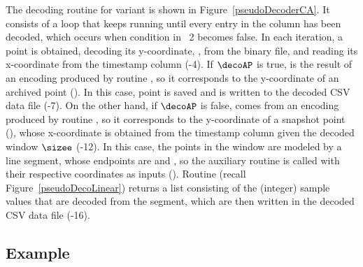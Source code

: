 \clearpage




\vspace{-9pt}



\vspace{-7pt}
The decoding routine for variant \maskalgo is shown in Figure~\ref{pseudoDecoderCA}. It consists of a loop that keeps running until every entry in the column has been decoded, which occurs when condition in \Line~2 becomes false. In each iteration, a point is obtained, decoding its y-coordinate, , from the binary file, and reading its x-coordinate from the timestamp column (-4). If $\decoAP$ is true,  is the result of an encoding produced by routine \CAWinStart, so it corresponds to the y-coordinate of an archived point (\archived). In this case, point \archived is saved and  is written to the decoded CSV data file (-7). On the other hand, if $\decoAP$ is false,  comes from an encoding produced by routine \CAWinEnd, so it corresponds to the y-coordinate of a snapshot point (\snapshot), whose x-coordinate is obtained from the timestamp column given the decoded window $\sizee$ (-12). In this case, the points in the window are modeled by a line segment, whose endpoints are \archived and \snapshot, so the auxiliary routine \decodeSegment is called with their respective coordinates as inputs (). Routine \decodeSegment (recall Figure~\ref{pseudoDecoLinear}) returns a list consisting of the (integer) sample values that are decoded from the segment, which are then written in the decoded CSV data file (-16).


\vspace{-8pt}





\clearpage
\subsection{Example}
\label{algo:ca:example}


